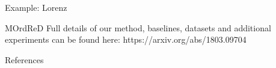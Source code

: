 \documentclass{beamer}
\theoremstyle{definition}
\theoremstyle{remark}
\begin{document}
\begin{frame}{Example: Lorenz}
~
\end{frame}

\begin{frame}{MOrdReD}
    Full details of our method, baselines, datasets and additional experiments can be found here: https://arxiv.org/abs/1803.09704
\end{frame}

\begin{frame}{References}
    \printbibliography
\end{frame}
\end{document}
